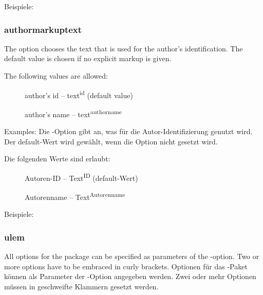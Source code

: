 		Beispiele:
	\fi


\subsubsection{authormarkuptext}
\ifENGLISH
	The  option chooses the text that is used for the author's identification.
	The default value is chosen if no explicit markup is given.

	The following values are allowed:
	\begin{description}
		\item [] author's id -- text\textsuperscript{id} (default value)
		\item [] author's name -- text\textsuperscript{authorname}
	\end{description}

	Examples:
\fi
	\ifGERMAN
		Die -Option gibt an, was für die Autor-Identifizierung genutzt wird.
		Der default-Wert wird gewählt, wenn die Option nicht gesetzt wird.

		Die folgenden Werte sind erlaubt:
		\begin{description}
			\item [] Autoren-ID -- Text\textsuperscript{ID} (default-Wert)
			\item [] Autorenname -- Text\textsuperscript{Autorenname}
		\end{description}

		Beispiele:
	\fi


\subsubsection{ulem}
\ifENGLISH
	All options for the  package can be specified as parameters of the -option.
	Two or more options have to be embraced in curly brackets.
\fi
	\ifGERMAN
		Optionen für das -Paket können als Parameter der -Option angegeben werden.
		Zwei oder mehr Optionen müssen in geschweifte Klammern gesetzt werden.
	\fi

\\

